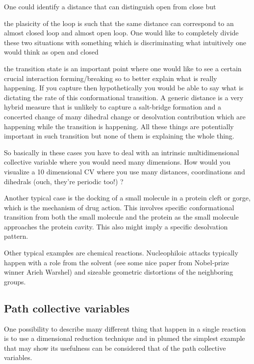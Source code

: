 One could identify a distance that can distinguish open from close but
\begin{DoxyItemize}
\item the plasicity of the loop is such that the same distance can correspond to an almost closed loop and almost open loop. One would like to completely divide these two situations with something which is discriminating what intuitively one would think as open and closed
\item the transition state is an important point where one would like to see a certain crucial interaction forming/breaking so to better explain what is really happening. If you capture then hypothetically you would be able to say what is dictating the rate of this conformational transition. A generic distance is a very hybrid measure that is unlikely to capture a salt-\/bridge formation and a concerted change of many dihedral change or desolvation contribution which are happening while the transition is happening. All these things are potentially important in such transition but none of them is explaining the whole thing.
\end{DoxyItemize}

So basically in these cases you have to deal with an intrinsic multidimensional collective variable where you would need many dimensions. How would you visualize a 10 dimensional C\+V where you use many distances, coordinations and dihedrals (ouch, they're periodic too!) ?

Another typical case is the docking of a small molecule in a protein cleft or gorge, which is the mechanism of drug action. This involves specific conformational transition from both the small molecule and the protein as the small molecule approaches the protein cavity. This also might imply a specific desolvation pattern.

Other typical examples are chemical reactions. Nucleophiloic attacks typically happen with a role from the solvent (see some nice paper from Nobel-\/prize winner Arieh Warshel) and sizeable geometric distortions of the neighboring groups.\hypertarget{belfast-2_belfast-2-pcvs-general}{}\subsection{Path collective variables}\label{belfast-2_belfast-2-pcvs-general}
One possibility to describe many different thing that happen in a single reaction is to use a dimensional reduction technique and in plumed the simplest example that may show its usefulness can be considered that of the path collective variables.

